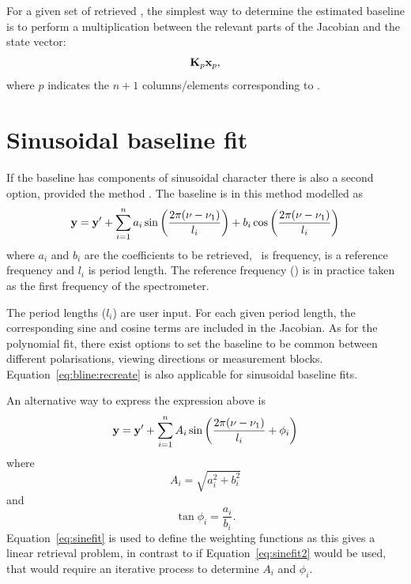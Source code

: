 For a given set of retrieved , the simplest way to determine the
estimated baseline is to perform a multiplication between the relevant parts of
the Jacobian and the state vector:
\begin{equation}
  \mathbf{K}_{p}\mathbf{x}_{p},
  \label{eq:bline:recreate}
\end{equation}
where $p$ indicates the $n+1$ columns/elements corresponding to .


\section{Sinusoidal baseline fit}
\label{sec:wfuns:sinefit}

If the baseline has components of sinusoidal character there is also a second
option, provided the method . The baseline is
in this method modelled as \citep{kuntz:97}
\begin{equation}
  \label{eq:sinefit}
  \mathbf{y} = \mathbf{y}' + \sum_{i=1}^n 
       a_i\sin\left(\frac{2\pi(\nu-\nu_{1})}{l_i}\right)+
       b_i\cos\left(\frac{2\pi(\nu-\nu_{1})}{l_i}\right)
\end{equation}
where $a_i$ and $b_i$ are the coefficients to be retrieved, \Frq\ is frequency,
 is a reference frequency and $l_i$ is period length. The reference
frequency () is in practice taken as the first frequency of the
spectrometer. 

The period lengths ($l_i$) are user input. For each given period length, the
corresponding sine and cosine terms are included in the Jacobian. As for the
polynomial fit, there exist options to set the baseline to be common between
different polarisations, viewing directions or measurement blocks.
Equation~\ref{eq:bline:recreate} is also applicable for sinusoidal baseline
fits.

An alternative way to express the expression above is
\begin{equation}
  \label{eq:sinefit2}
  \mathbf{y} = \mathbf{y}' + \sum_{i=1}^n A_i
             \sin\left(\frac{2\pi(\nu-\nu_{1})}{l_i} + \phi_i\right)
\end{equation}
where
\begin{equation}
  A_i = \sqrt{a_i^2+b_i^2}
\end{equation}
and
\begin{equation}
  \tan{\phi_i} = \frac{a_i}{b_i}.
\end{equation}
Equation~\ref{eq:sinefit} is used to define the weighting functions as this
gives a linear retrieval problem, in contrast to if Equation~\ref{eq:sinefit2}
would be used, that would require an iterative process to determine $A_i$
and $\phi_i$.

